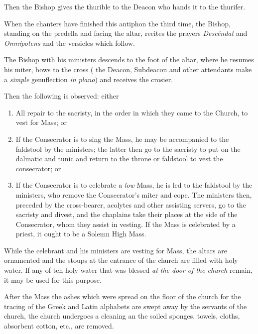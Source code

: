 \documentclass[letterpaper]{report}
\begin{document}
{Then the Bishop gives the thurible to the Deacon who hands it to the thurifer.

\rubric When the chanters have finished this antiphon the third time, the
Bishop, standing on the predella and facing the altar, recites the prayers
\textit{Descéndat} and \textit{Omnípotens} and the versicles which follow.

\rubric The Bishop with his ministers descends to the foot of the altar, where
he resumes his miter, bows to the cross ( the Deacon, Subdeacon and other
attendants make a \textit{simple} genuflection \textit{in plano}) and receives
the crosier.

Then the following is observed: either

\begin{enumerate}

    \item All repair to the sacristy, in the order in which they came to the
        Church, to vest for Mass; or

    \item If the Consecrator is to sing the Mass, he may be accompanied to the
        faldstool by the ministers; the latter then go to the sacristy to put
        on the dalmatic and tunic and return to the throne or faldstool to vest
        the consecrator; or

    \item If the Consecrator is to celebrate a \textit{low} Mass, he is led to
        the faldstool by the ministers, who remove the Consecrator's miter and
        cope. The ministers then, preceded by the cross-bearer, acolytes and
        other assisting servers, go to the sacristy and divest, and the
        chaplains take their places at the side of the Consecrator, whom they
        assist in vesting. If the Mass is celebrated by a priest, it ought to
        be a Solemn High Mass.
    
\end{enumerate}

While the celebrant and his ministers are vesting for Mass, the altars are
ornamented and the stoups at the entrance of the church are filled with holy
water. If any of teh holy water that was blessed \textit{at the door of the
church} remain, it may be used for this purpose.

After the Mass the ashes which were spread on the floor of the church for the
tracing of the Greek and Latin alphabets are swept away by the servants of the
church, the church undergoes a cleaning an the soiled sponges, towels, cloths,
absorbent cotton, etc., are removed.

}
\end{document}
